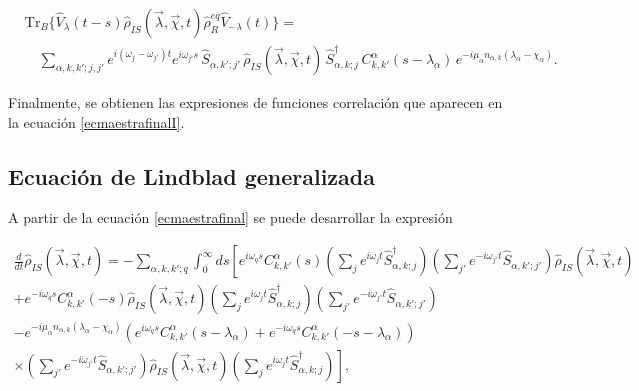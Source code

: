 \begin{appendixs}
 \begin{align*}
    & \mathrm{Tr}_{B}\{ \hat{V}_{\lambda}(t-s)\hat{\rho}_{IS}(\vec{\lambda},\vec{\chi},t)\hat{\rho}_{R}^{eq}\hat{V}_{-\lambda}(t) \} = \\
    & \quad \sum_{\alpha,k,k';j,j'} e^{i(\omega_{j}-\omega_{j'})t} e^{i\omega_{j'}s}\, 
    \hat{S}_{\alpha,k';j'}\, \hat{\rho}_{IS}(\vec{\lambda},\vec{\chi},t)\, \hat{S}^{\dagger}_{\alpha,k;j}\,
    C^{\alpha}_{k,k'}(s-\lambda_{\alpha})\, e^{-i\mu_{\alpha}n_{\alpha,k}(\lambda_{\alpha}-\chi_{\alpha})}.
 \end{align*}
   
Finalmente, se obtienen las expresiones de funciones correlación que aparecen en la ecuación \eqref{ecmaestrafinalI}.
\label{finalequation}


\subsection{Ecuación de Lindblad generalizada}

A partir de la ecuación \eqref{ecmaestrafinal} se puede desarrollar la expresión

\begin{multline*}
    \frac{d}{dt}\hat{\rho}_{IS}(\vec{\lambda},\vec{\chi},t) = - \sum_{\alpha,k,k';q} \int_{0}^{\infty}ds \left[e^{i\omega_{q}s}C^{\alpha}_{k,k'}(s) \left(\sum_{j}e^{i\omega_{j}t}\hat{S}^{\dagger}_{\alpha,k;j} \right)\left(\sum_{j'}e^{-i\omega_{j'}t}\hat{S}_{\alpha,k';j'} \right)\hat{\rho}_{IS}(\vec{\lambda},\vec{\chi},t)  \right. \\
    \left. +  e^{-i\omega_{q}s}C^{\alpha}_{k,k'}(-s) \hat{\rho}_{IS}(\vec{\lambda},\vec{\chi},t) \left(\sum_{j}e^{i\omega_{j}t}\hat{S}^{\dagger}_{\alpha,k;j} \right)\left(\sum_{j'}e^{-i\omega_{j'}t}\hat{S}_{\alpha,k';j'} \right)\right. \\
    \left. - e^{-i\mu_{\alpha}n_{\alpha,k}(\lambda_{\alpha}-\chi_{\alpha})}(e^{i\omega_{q}s}C^{\alpha}_{k,k'}(s-\lambda_{\alpha}) + e^{-i\omega_{q}s}C^{\alpha}_{k,k'}(-s-\lambda_{\alpha}) ) \right.\\
    \left.\times \left(\sum_{j'}e^{-i\omega_{j'}t}\hat{S}_{\alpha,k';j'} \right)\hat{\rho}_{IS}(\vec{\lambda},\vec{\chi},t) \left(\sum_{j}e^{i\omega_{j}t}\hat{S}^{\dagger}_{\alpha,k;j} \right)    \right],   
\end{multline*}


\end{appendixs}
